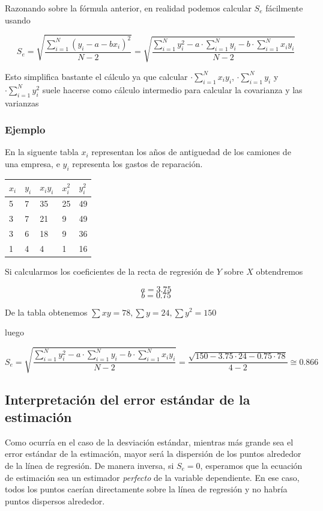\documentclass[
]{article}
\begin{document}
Razonando sobre la fórmula anterior, en realidad podemos calcular
\(S_e\) fácilmente usando

\[S_e =  \sqrt{\frac{\sum^N_{i=1} (y_i - a - bx_i)^2 }{N-2}} =\sqrt{\frac{\sum^N_{i=1} y_i^2 - a \cdot \sum^N_{i=1} y_i - b\cdot \sum^N_{i=1} x_i y_i }{N-2}} \]

Esto simplifica bastante el cálculo ya que calcular
\(\cdot \sum^N_{i=1} x_i y_i\), \(\cdot \sum^N_{i=1} y_i\) y
\(\cdot \sum^N_{i=1} y_i^2\) suele hacerse como cálculo intermedio para
calcular la covarianza y las varianzas

\hypertarget{ejemplo-3}{%
\subsubsection{Ejemplo}\label{ejemplo-3}}

En la siguente tabla \(x_i\) representan los años de antiguedad de los
camiones de una empresa, e \(y_i\) representa los gastos de reparación.

\begin{longtable}[]{@{}lllll@{}}
\toprule
\(x_i\) & \(y_i\) & \(x_iy_i\) & \(x_i^2\) & \(y_i^2\)\tabularnewline
\midrule
\endhead
5 & 7 & 35 & 25 & 49\tabularnewline
3 & 7 & 21 & 9 & 49\tabularnewline
3 & 6 & 18 & 9 & 36\tabularnewline
1 & 4 & 4 & 1 & 16\tabularnewline
\bottomrule
\end{longtable}

Si calcularmos los coeficientes de la recta de regresión de \(Y\) sobre
\(X\) obtendremos

\[a=3.75\] \[b=0.75\]

De la tabla obtenemos \(\sum xy = 78, \sum y = 24, \sum y^2 = 150\)

luego

\[S_e = \sqrt{\frac{\sum^N_{i=1} y_i^2 - a \cdot \sum^N_{i=1} y_i - b\cdot \sum^N_{i=1} x_i y_i }{N-2}} = \frac{ \sqrt{150 - 3.75 \cdot24 - 0.75 \cdot 78}}{4-2} \cong 0.866\]

\hypertarget{interpretaciuxf3n-del-error-estuxe1ndar-de-la-estimaciuxf3n}{%
\subsection{Interpretación del error estándar de la
estimación}\label{interpretaciuxf3n-del-error-estuxe1ndar-de-la-estimaciuxf3n}}

Como ocurría en el caso de la desviación estándar, mientras más grande
sea el error estándar de la estimación, mayor será la dispersión de los
puntos alrededor de la línea de regresión. De manera inversa, si
\(S_e=0\), esperamos que la ecuación de estimación sea un estimador
\emph{perfecto} de la variable dependiente. En ese caso, todos los
puntos caerían directamente sobre la línea de regresión y no habría
puntos dispersos alrededor.
\end{document}
